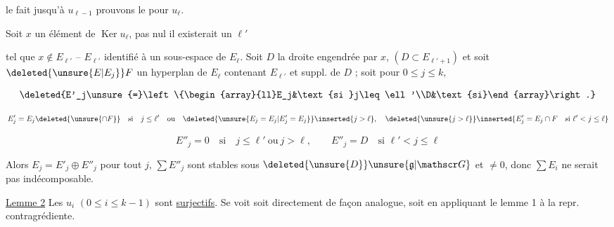 
le fait jusqu'à $u_{\ell-1}$  prouvons le pour $u_\ell$.

 Soit $x$ un élément de $\operatorname{Ker}u_\ell$,   pas nul il existerait un    $\ell'$ 

tel que $x\notin E_{\ell'}$ -- $E_{\ell'}$ identifié à un sous-espace de $E_\ell$. Soit $D$ la droite engendrée par $x$,  $(D\subset E_{\ell'+1})$ et soit $\deleted{\unsure{E|E_j}}F$ un hyperplan de $E_\ell$  contenant $E_{\ell'}$ et suppl. de $D$ ; soit pour $0\leq j\leq k$,


\[\deleted{E'_j\unsure{=}\left\{\begin{array}{ll}E_j&\text{si }j\leq\ell'\\D&\text{si}\end{array}\right.}\]

\[E'_j=E_j\deleted{\unsure{\cap F}}\quad\text{si}\quad j\leq\ell'\quad\text{ou}\quad\deleted{\unsure{E_j=E_j|E'_j=E_j}}\inserted{j>\ell},\quad\deleted{\unsure{j>\ell}}\inserted{E'_j=E_j\cap F\quad\text{si }\ell'<j\leq\ell}\]

\[ E''_j=0\quad\text{si}\quad j\leq\ell'\ \text{ou}\ j>\ell,\qquad E''_j=D\quad\text{si }\ell'<j\leq\ell \]

Alors $E_j=E'_j\oplus E''_j$ pour tout $j$,   $\sum E''_j$ sont stables sous $\deleted{\unsure{D}}\unsure{\mathfrak g|\mathscr G}$ et $\ne0$, donc $\sum E_i$ ne serait pas indécomposable.

\uline{Lemme 2} Les $u_i$ $(0\leq i\leq k-1)$ sont \uline{surjectifs}. Se voit soit directement de façon analogue, soit en  appliquant le lemme 1 à la repr. contragrédiente.

